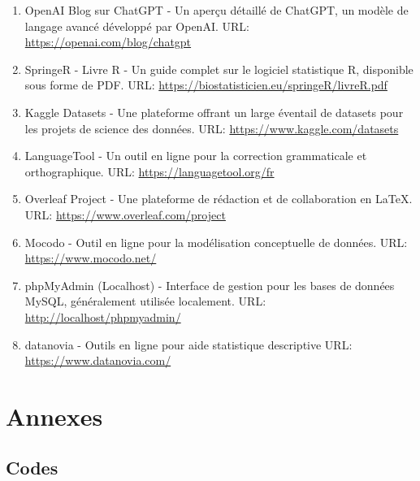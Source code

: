 \documentclass[mstat,12pt]{unswthesis}
\begin{document}



\begin{enumerate}
\def\labelenumi{\arabic{enumi}.}
\item
  OpenAI Blog sur ChatGPT - Un aperçu détaillé de ChatGPT, un modèle de
  langage avancé développé par OpenAI. \smallskip URL:
  \url{https://openai.com/blog/chatgpt} \medskip
\item
  SpringeR - Livre R - Un guide complet sur le logiciel statistique R,
  disponible sous forme de PDF. \smallskip URL:
  \url{https://biostatisticien.eu/springeR/livreR.pdf} \medskip
\item
  Kaggle Datasets - Une plateforme offrant un large éventail de datasets
  pour les projets de science des données. \smallskip URL:
  \url{https://www.kaggle.com/datasets} \medskip
\item
  LanguageTool - Un outil en ligne pour la correction grammaticale et
  orthographique. \smallskip URL: \url{https://languagetool.org/fr}
  \medskip
\item
  Overleaf Project - Une plateforme de rédaction et de collaboration en
  LaTeX. \smallskip URL: \url{https://www.overleaf.com/project} \medskip
\item
  Mocodo - Outil en ligne pour la modélisation conceptuelle de données.
  \smallskip URL: \url{https://www.mocodo.net/} \medskip
\item
  phpMyAdmin (Localhost) - Interface de gestion pour les bases de
  données MySQL, généralement utilisée localement. \smallskip URL:
  \url{http://localhost/phpmyadmin/} \medskip
\item
  datanovia - Outils en ligne pour aide statistique descriptive
  \smallskip URL: \url{https://www.datanovia.com/}
\end{enumerate}

\newpage

\hypertarget{annexes}{%
\chapter*{Annexes}\label{annexes}}

\hypertarget{codes}{%
\section*{\texorpdfstring{\textbf{Codes}}{Codes}}\label{codes}}
\end{document}
